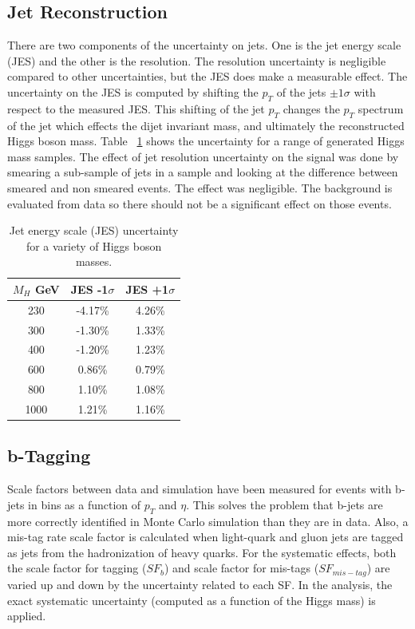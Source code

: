 \subsection{Jet Reconstruction}
\label{JESsystematics}

There are two components of the uncertainty on jets.  One is the jet energy scale (JES) and the other is the resolution.  The resolution uncertainty is negligible compared to other uncertainties, but the JES does make a measurable effect.  The uncertainty on the JES is computed by shifting the $p_T$ of the jets $\pm 1 \sigma$ with respect to the measured JES.  This shifting of the jet $p_T$ changes the $p_T$ spectrum of the jet which effects the dijet invariant mass, and ultimately the reconstructed Higgs boson mass.  Table ~\ref{tab:JES} shows the uncertainty for a range of generated Higgs mass samples. The effect of jet resolution uncertainty on the signal was done by smearing a sub-sample of jets in a sample and looking at the difference between smeared and non smeared events. The effect was negligible.  The background is evaluated from data so there should not be a significant effect on those events.


\begin{table}[htb]
\caption{%
    Jet energy scale (JES) uncertainty for a variety of Higgs boson masses.
}
\begin{center}

    \begin{tabular}{ | c | c | c |}
      \hline
      $M_H$ GeV & JES -1$\sigma$ & JES +1$\sigma$ \\ \hline \hline
      230  & -4.17\% & 4.26\% \\
      300  & -1.30\% & 1.33\% \\
      400  & -1.20\% & 1.23\% \\ 
      600  & 0.86\%  & 0.79\% \\
      800  & 1.10\%  & 1.08\% \\
      1000 & 1.21\%  & 1.16\% \\ \hline
      
    \end{tabular}
\end{center}
\label{tab:JES}
\end{table}




\subsection{b-Tagging}
Scale factors between data and simulation have been measured for events with b-jets in bins as a function of $p_T$ and $\eta$.  This solves the problem that b-jets are more correctly identified in Monte Carlo simulation than they are in data.  Also, a mis-tag rate scale factor is calculated when light-quark and gluon jets are tagged as jets from the hadronization of heavy quarks.  For the systematic effects, both the scale factor for tagging ($SF_b$) and scale factor for mis-tags ($SF_{mis-tag}$) are varied up and down by the uncertainty related to each SF. In the analysis, the exact systematic uncertainty (computed as a function of the Higgs mass) is applied.


